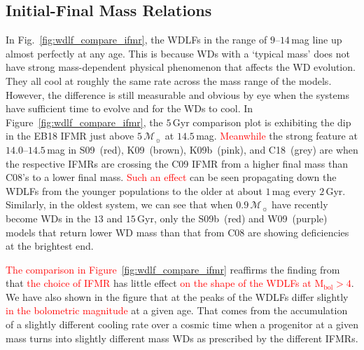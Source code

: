 \documentclass[fleqn,usenatbib]{rasti}
\newcommand{\msun}{\mathcal{M}_{\sun}}
\begin{document}
\subsection{Initial-Final Mass Relations}
In Fig.~\ref{fig:wdlf_compare_ifmr}, the WDLFs in the range of $9$--$14$\,mag
line up almost perfectly at any age. This is because WDs with a `typical mass'
does not have strong mass-dependent physical phenomenon that affects the WD
evolution. They all cool at roughly the same rate across the mass range of the
models. However, the difference is still measurable and obvious by eye when
the systems have sufficient time to evolve and for the WDs to cool. In 
Figure~\ref{fig:wdlf_compare_ifmr}, the $5$\,Gyr comparison plot is exhibiting
the dip in the EB18 IFMR just above $5\,\msun$ at $14.5$\,mag. \textcolor{red}{Meanwhile} the strong
feature at $14.0$--$14.5$\,mag in S09~(red), K09~(brown), K09b~(pink), and
C18~(grey) are when the respective IFMRs are crossing the C09 IFMR from a higher
final mass than C08's to a lower final mass. \textcolor{red}{Such an effect} can be seen propagating
down the WDLFs from the younger populations to the older at about $1$\,mag every
$2$\,Gyr. Similarly, in the oldest system, we can see that when $0.9\,\msun$
have recently become WDs in the $13$ and $15$\,Gyr, only the S09b~(red) and
W09~(purple) models that return lower WD mass than that from C08 are showing
deficiencies at the brightest end. 

\textcolor{red}{The comparison in Figure~\ref{fig:wdlf_compare_ifmr}} reaffirms
the finding from \citet{2008MNRAS.387.1693C} that
\textcolor{red}{the choice of IFMR} has little effect \textcolor{red}{on the
shape of the WDLFs at $\mathrm{M}_{\mathrm{bol}}>4$}.
We have also shown in the figure that at the peaks of the WDLFs differ slightly
\textcolor{red}{in the bolometric magnitude} at a given age. That comes from the
accumulation of a slightly different cooling rate over a cosmic time when a
progenitor at a given mass turns into slightly different mass WDs as prescribed
by the different IFMRs.
 
\end{document}
